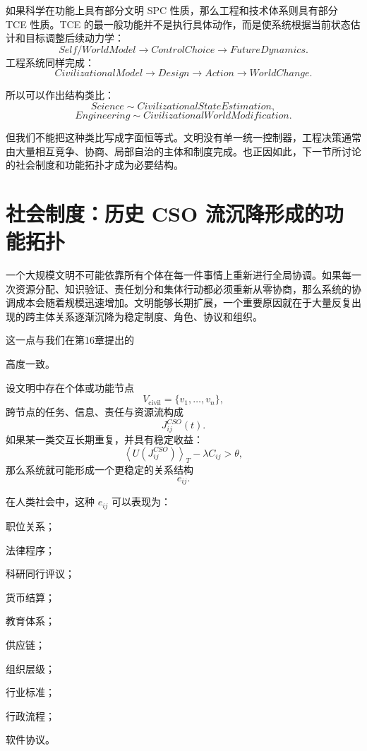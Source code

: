 如果科学在功能上具有部分文明 SPC 性质，那么工程和技术体系则具有部分 TCE 性质。TCE 的最一般功能并不是执行具体动作，而是使系统根据当前状态估计和目标调整后续动力学：
\[
Self/WorldModel
\rightarrow
ControlChoice
\rightarrow
FutureDynamics.
\]
工程系统同样完成：
\[
CivilizationalModel
\rightarrow
Design
\rightarrow
Action
\rightarrow
WorldChange.
\]

所以可以作出结构类比：
\[
Science
\sim
CivilizationalStateEstimation,
\]
\[
Engineering
\sim
CivilizationalWorldModification.
\]

但我们不能把这种类比写成字面恒等式。文明没有单一统一控制器，工程决策通常由大量相互竞争、协商、局部自治的主体和制度完成。也正因如此，下一节所讨论的社会制度和功能拓扑才成为必要结构。


\section{社会制度：历史 CSO 流沉降形成的功能拓扑}

一个大规模文明不可能依靠所有个体在每一件事情上重新进行全局协调。如果每一次资源分配、知识验证、责任划分和集体行动都必须重新从零协商，那么系统的协调成本会随着规模迅速增加。文明能够长期扩展，一个重要原因就在于大量反复出现的跨主体关系逐渐沉降为稳定制度、角色、协议和组织。

这一点与我们在第16章提出的
\begin{statementbox}
\centering
{}
\end{statementbox}
高度一致。

设文明中存在个体或功能节点
\[
V_{\mathrm{civil}}
=
\{v_1,\ldots,v_n\},
\]
跨节点的任务、信息、责任与资源流构成
\[
J_{ij}^{CSO}(t).
\]
如果某一类交互长期重复，并具有稳定收益：
\[
\left\langle
U(J_{ij}^{CSO})
\right\rangle_T
-
\lambda C_{ij}
>
\theta,
\]
那么系统就可能形成一个更稳定的关系结构
\[
e_{ij}.
\]

在人类社会中，这种 $e_{ij}$ 可以表现为：

职位关系；

法律程序；

科研同行评议；

货币结算；

教育体系；

供应链；

组织层级；

行业标准；

行政流程；

软件协议。

